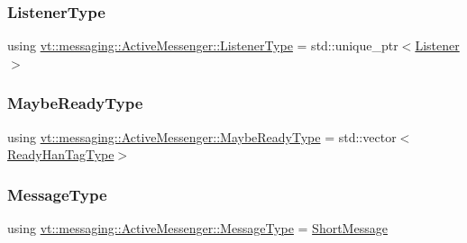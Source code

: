 \mbox{\label{structvt_1_1messaging_1_1_active_messenger_a63878fd4ef1fbc505bd1313d32049ca9}} 
\subsubsection{\texorpdfstring{Listener\+Type}{ListenerType}}
{\footnotesize\ttfamily using \hyperlink{structvt_1_1messaging_1_1_active_messenger_a63878fd4ef1fbc505bd1313d32049ca9}{vt\+::messaging\+::\+Active\+Messenger\+::\+Listener\+Type} =  std\+::unique\+\_\+ptr$<$\hyperlink{structvt_1_1messaging_1_1_listener}{Listener}$>$}

\mbox{\label{structvt_1_1messaging_1_1_active_messenger_a745d5e8cad8c2f67d20479afacc6e134}} 
\subsubsection{\texorpdfstring{Maybe\+Ready\+Type}{MaybeReadyType}}
{\footnotesize\ttfamily using \hyperlink{structvt_1_1messaging_1_1_active_messenger_a745d5e8cad8c2f67d20479afacc6e134}{vt\+::messaging\+::\+Active\+Messenger\+::\+Maybe\+Ready\+Type} =  std\+::vector$<$\hyperlink{structvt_1_1messaging_1_1_active_messenger_a98bb74aa4a561161dd7c7073dcd5f1d3}{Ready\+Han\+Tag\+Type}$>$}

\mbox{\label{structvt_1_1messaging_1_1_active_messenger_a720a2b1e7462d414b2a51d9fe005eca9}} 
\subsubsection{\texorpdfstring{Message\+Type}{MessageType}}
{\footnotesize\ttfamily using \hyperlink{structvt_1_1messaging_1_1_active_messenger_a720a2b1e7462d414b2a51d9fe005eca9}{vt\+::messaging\+::\+Active\+Messenger\+::\+Message\+Type} =  \hyperlink{namespacevt_a1125ac1da6c0bbf141e0ea0739d7602d}{Short\+Message}}

